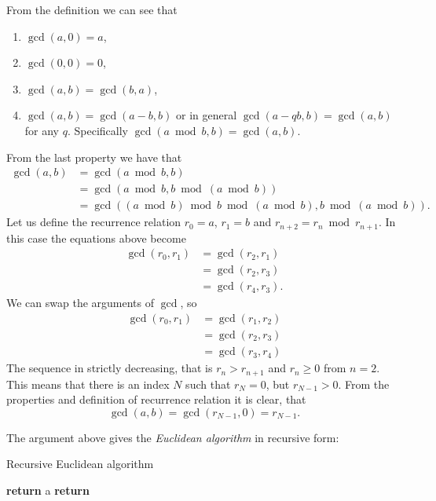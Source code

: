 \documentclass{article}
\begin{document}
From the definition we can see that
\begin{enumerate}
    \item $\gcd(a,0)=a$,
    \item $\gcd(0,0)=0$,
    \item $\gcd(a,b)=\gcd(b,a)$,
    \item $\gcd(a, b) = \gcd(a - b, b)$ or in general $\gcd(a-qb, b) = \gcd(a,b)$ for any $q$. Specifically $\gcd(a \bmod b, b) = \gcd(a, b)$.
\end{enumerate}

From the last property we have that
\begin{align*}
    \gcd(a, b) &= \gcd(a \bmod b, b) \\
               &= \gcd\left(a \bmod b, b \bmod \left(a \bmod b\right)\right) \\
               &= \gcd\left(\left(a \bmod b\right) \bmod b \bmod \left(a \bmod b\right), b \bmod \left(a \bmod b\right)\right).
\end{align*}
Let us define the recurrence relation $r_0 = a$, $r_1 = b$ and $r_{n+2} = r_{n} \bmod r_{n+1}$.
In this case the equations above become
\begin{align*}
    \gcd(r_0, r_1) &= \gcd(r_2, r_1) \\
                   &= \gcd\left(r_2, r_3\right) \\
                   &= \gcd\left(r_4, r_3\right).
\end{align*}
We can swap the arguments of $\gcd$, so
\begin{align*}
    \gcd(r_0, r_1) &= \gcd(r_1, r_2) \\
                   &= \gcd\left(r_2, r_3\right) \\
                   &= \gcd\left(r_3, r_4\right)
\end{align*}
The sequence in strictly decreasing, that is $r_n > r_{n+1}$ and $r_{n} \ge 0$ from $n=2$.
This means that there is an index $N$ such that $r_N = 0$, but $r_{N-1} > 0$.
From the properties and definition of recurrence relation it is clear, that
\[
    \gcd(a, b) = \gcd(r_{N-1}, 0) = r_{N-1}.
\]

The argument above gives the \emph{Euclidean algorithm} in recursive form:
\begin{algorithm}
    \caption{Recursive Euclidean algorithm}
    \label{alg:recursive-gcd}
    \begin{algorithmic}[1]
                \State \textbf{return} a
            \EndIf
            \State \textbf{return} 
        \EndProcedure
    \end{algorithmic}
\end{algorithm}
\end{document}
